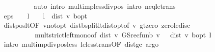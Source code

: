 \begin{isabellebody}
\ \ \ \ \ \ \ \ \isamarkupfalse%
\ {\isacharparenleft}{\kern0pt}auto\ intro{\isacharbang}{\kern0pt}{\isacharcolon}{\kern0pt}\ mult{\isacharunderscore}{\kern0pt}imp{\isacharunderscore}{\kern0pt}less{\isacharunderscore}{\kern0pt}div{\isacharunderscore}{\kern0pt}pos\ intro{\isacharcolon}{\kern0pt}\ neq{\isacharunderscore}{\kern0pt}le{\isacharunderscore}{\kern0pt}trans{\isacharparenright}{\kern0pt}\isanewline
\ \ \ \ \ \ \isamarkupfalse%
\ {\isachardoublequoteopen}eps\ {\isacharasterisk}{\kern0pt}\ {\isacharparenleft}{\kern0pt}{}\ {\isacharminus}{\kern0pt}\ l{\isacharparenright}{\kern0pt}\ {\isacharslash}{\kern0pt}\ {\isacharparenleft}{\kern0pt}{}\ {\isacharasterisk}{\kern0pt}\ l{\isacharparenright}{\kern0pt}\ {\isacharless}{\kern0pt}\ dist\ v\ {\isasymnu}\isactrlsub b{\isacharunderscore}{\kern0pt}opt{\isachardoublequoteclose}\ \isanewline
\ \ \ \ \ \ \ \ \isamarkupfalse%
\ dist{\isacharunderscore}{\kern0pt}pos{\isacharunderscore}{\kern0pt}lt{\isacharbrackleft}{\kern0pt}OF\ v{\isacharunderscore}{\kern0pt}not{\isacharunderscore}{\kern0pt}opt{\isacharbrackright}{\kern0pt}\ dist{\isacharunderscore}{\kern0pt}{\isasymL}\isactrlsub b{\isacharunderscore}{\kern0pt}split{\isacharunderscore}{\kern0pt}lt{\isacharunderscore}{\kern0pt}dist{\isacharunderscore}{\kern0pt}opt{\isacharbrackleft}{\kern0pt}of\ v{\isacharbrackright}{\kern0pt}\ gt{\isacharunderscore}{\kern0pt}zero\ zero{\isacharunderscore}{\kern0pt}le{\isacharunderscore}{\kern0pt}disc\ \isanewline
\ \ \ \ \ \ \ \ \ \ mult{\isacharunderscore}{\kern0pt}strict{\isacharunderscore}{\kern0pt}left{\isacharunderscore}{\kern0pt}mono{\isacharbrackleft}{\kern0pt}of\ {\isachardoublequoteopen}dist\ v\ {\isacharparenleft}{\kern0pt}GS{\isacharunderscore}{\kern0pt}rec{\isacharunderscore}{\kern0pt}fun\isactrlsub b\ v{\isacharparenright}{\kern0pt}{\isachardoublequoteclose}\ {\isachardoublequoteopen}{\isacharparenleft}{\kern0pt}{}\ {\isacharasterisk}{\kern0pt}\ dist\ v\ {\isasymnu}\isactrlsub b{\isacharunderscore}{\kern0pt}opt{\isacharparenright}{\kern0pt}{\isachardoublequoteclose}\ l{\isacharbrackright}{\kern0pt}\isanewline
\ \ \ \ \ \ \ \ \isamarkupfalse%
\ {\isacharparenleft}{\kern0pt}intro\ mult{\isacharunderscore}{\kern0pt}imp{\isacharunderscore}{\kern0pt}div{\isacharunderscore}{\kern0pt}pos{\isacharunderscore}{\kern0pt}less\ le{\isacharunderscore}{\kern0pt}less{\isacharunderscore}{\kern0pt}trans{\isacharbrackleft}{\kern0pt}OF\ dist{\isacharunderscore}{\kern0pt}ge{\isacharbrackright}{\kern0pt}{\isacharcomma}{\kern0pt}\ argo{\isacharplus}{\kern0pt}{\isacharparenright}{\kern0pt}\isanewline

\end{isabellebody}
